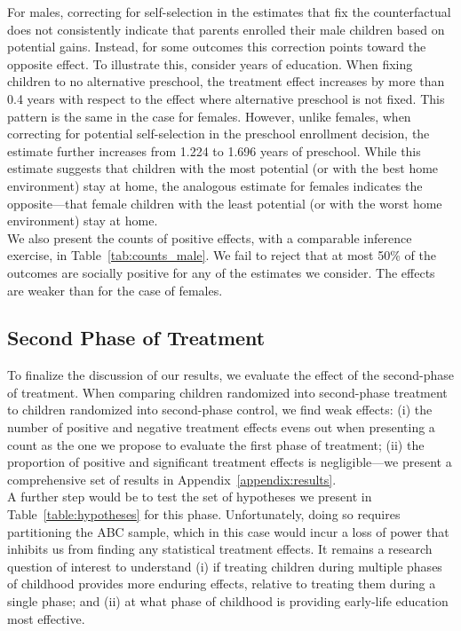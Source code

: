 \noindent For males, correcting for self-selection in the estimates that fix the counterfactual does not consistently indicate that parents enrolled their male children based on potential gains. Instead, for some outcomes this correction points toward the opposite effect. To illustrate this, consider years of education. When fixing children to no alternative preschool, the treatment effect increases by more than 0.4 years with respect to the effect where alternative preschool is not fixed. This pattern is the same in the case for females. However, unlike females, when correcting for potential self-selection in the preschool enrollment decision, the estimate further increases from 1.224 to 1.696 years of preschool. While this estimate suggests that children with the most potential (or with the best home environment) stay at home, the analogous estimate for females indicates the opposite---that female children with the least potential (or with the worst home environment) stay at home.\\

\noindent We also present the counts of positive effects, with a comparable inference exercise, in Table~\ref{tab:counts_male}. We fail to reject that at most 50\% of the outcomes are socially positive for any of the estimates we consider. The effects are weaker than for the case of females.\\





\subsection{Second Phase of Treatment} \label{section:second}

\noindent To finalize the discussion of our results, we evaluate the effect of the second-phase of treatment. When comparing children randomized into second-phase treatment to children randomized into second-phase control, we find weak effects: (i) the number of positive and negative treatment effects evens out when presenting a count as the one we propose to evaluate the first phase of treatment; (ii) the proportion of positive and significant treatment effects is negligible---we present a comprehensive set of results in Appendix~\ref{appendix:results}.\\

\noindent A further step would be to test the set of hypotheses we present in Table~\ref{table:hypotheses} for this phase. Unfortunately, doing so requires partitioning the ABC sample, which in this case would incur a loss of power that inhibits us from finding any statistical treatment effects. It remains a research question of interest to understand (i) if treating children during multiple phases of childhood provides more enduring effects, relative to treating them during a single phase; and (ii) at what phase of childhood is providing early-life education most effective.


